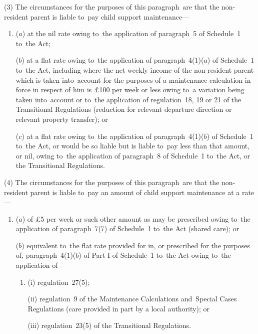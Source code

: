 \documentclass[12pt,a4paper]{article}
\begin{document}
(3) The circumstances for the purposes of this paragraph~are that the non-resident parent is liable to~pay child support maintenance—
\begin{enumerate}\item[]
($a$) at the nil rate owing to~the application of paragraph~5 of Schedule~1 to~the Act;

($b$) at a flat rate owing to~the application of paragraph~4(1)($a$)  of Schedule~1 to~the Act, including where the net weekly income of the non-resident parent which is taken into~account for the purposes of a maintenance calculation in force in respect of him is £100 per week or less owing to~a variation being taken into~account or to~the application of regulation~18, 19 or 21 of the Transitional Regulations (reduction for relevant departure direction or relevant property transfer); or

($c$) at a flat rate owing to~the application of paragraph~4(1)($b$)  of Schedule~1 to~the Act, or would be so liable but is liable to~pay less than that amount, or nil, owing to~the application of paragraph~8 of Schedule~1 to~the Act, or the Transitional Regulations.
\end{enumerate}

(4) The circumstances for the purposes of this paragraph~are that the non-resident parent is liable to~pay an amount of child support maintenance at a rate—
\begin{enumerate}\item[]
($a$) of £5 per week or such other amount as may be prescribed owing to~the application of paragraph~7(7) of Schedule~1 to~the Act (shared care); or

($b$) equivalent to~the flat rate provided for in, or prescribed for the purposes of, paragraph~4(1)($b$)  of Part I of Schedule~1 to~the Act owing to~the application of—
\begin{enumerate}\item[]
(i) regulation~27(5);

(ii) regulation~9 of the Maintenance Calculations and~Special Cases Regulations (care provided in part by a local authority); or

(iii) regulation~23(5) of the Transitional Regulations.
\end{enumerate}
\end{enumerate}
\end{document}
